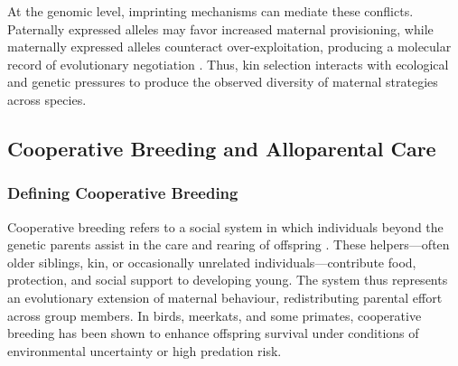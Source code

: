         At the genomic level, imprinting mechanisms can mediate these conflicts.  Paternally expressed alleles may favor increased maternal provisioning, while maternally expressed alleles counteract over-exploitation, producing a molecular record of evolutionary negotiation \cite{haig2014}.  Thus, kin selection interacts with ecological and genetic pressures to produce the observed diversity of maternal strategies across species.



    

    \subsection{Cooperative Breeding and Alloparental Care}
        \subsubsection{Defining Cooperative Breeding}
        Cooperative breeding refers to a social system in which individuals beyond the genetic parents assist in the care and rearing of offspring \cite{cluttonbrock2002, cockburn2006}.  These helpers—often older siblings, kin, or occasionally unrelated individuals—contribute food, protection, and social support to developing young.  The system thus represents an evolutionary extension of maternal behaviour, redistributing parental effort across group members.  In birds, meerkats, and some primates, cooperative breeding has been shown to enhance offspring survival under conditions of environmental uncertainty or high predation risk.  

